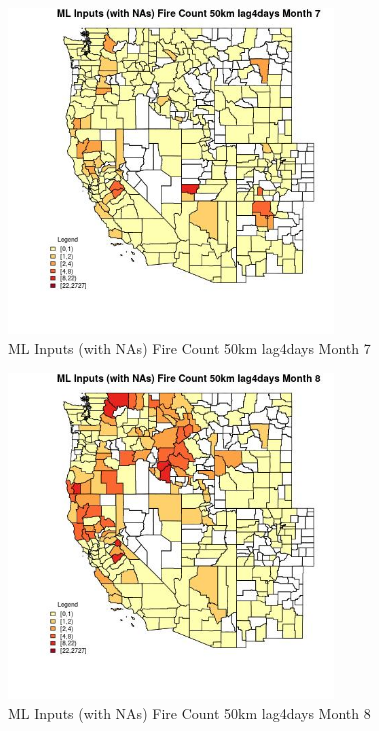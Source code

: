 \clearpage 

\begin{figure} 
\centering  
\includegraphics[width=0.77\textwidth]{Code_Outputs/Report_ML_input_PM25_Step4_part_f_de_duplicated_aveswNAs_CountyFire_Count_50km_lag4daysmedianMonth7.jpg} 
\caption{\label{fig:Report_ML_input_PM25_Step4_part_f_de_duplicated_aveswNAsCountyFire_Count_50km_lag4daysmedianMonth7}ML Inputs (with NAs) Fire Count 50km lag4days Month 7} 
\end{figure} 
 

\begin{figure} 
\centering  
\includegraphics[width=0.77\textwidth]{Code_Outputs/Report_ML_input_PM25_Step4_part_f_de_duplicated_aveswNAs_CountyFire_Count_50km_lag4daysmedianMonth8.jpg} 
\caption{\label{fig:Report_ML_input_PM25_Step4_part_f_de_duplicated_aveswNAsCountyFire_Count_50km_lag4daysmedianMonth8}ML Inputs (with NAs) Fire Count 50km lag4days Month 8} 
\end{figure} 
 


